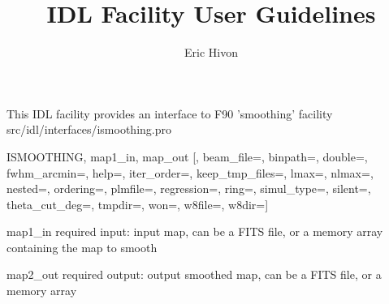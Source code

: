 
\sloppy

\title{\healpix IDL Facility User Guidelines}
 \section[ismoothing]{ }
\label{idl:ismoothing}
\author{Eric Hivon}

\begin{facility}
{This IDL facility provides an interface to F90 'smoothing' facility}
{src/idl/interfaces/ismoothing.pro}
\end{facility}

\begin{IDLformat}
{ISMOOTHING,  map1\_in, map\_out [, beam\_file=, binpath=, double=,
fwhm\_arcmin=, 
help=, iter\_order=, keep\_tmp\_files=, 
       lmax=, nlmax=, nested=, ordering=, plmfile=, regression=, ring=, 
       simul\_type=, silent=, theta\_cut\_deg=, tmpdir=, won=, w8file=, w8dir=]}
\end{IDLformat}

\begin{qualifiers}
  \begin{qulist}{} %
   \item[map1\_in] required input: input map, can be a FITS file, or a memory array containing the
        map to smooth
    \item[map2\_out] required output: output smoothed map, can be a FITS file, or a memory array
  \end{qulist}
\end{qualifiers}

